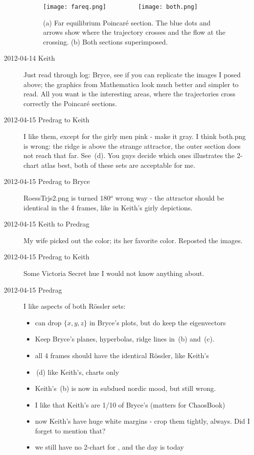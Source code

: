 \begin{description}
 \begin{figure}[H]
 \begin{center}
\texttt{[image: fareq.png]}%
~~~~~~~~
\texttt{[image: both.png]}%
 \end{center}
 \caption{
(a)
Far equilibrium Poincar\'e section. The blue dots and arrows show where
the trajectory crosses and the flow at the crossing.
(b)
Both sections superimposed.
    }{\label{fig:bothpoin}}
 \end{figure}

\item[2012-04-14 Keith] Just read through log: Bryce, see if you can
replicate the images I posed above; the graphics from Mathematica look
much better and simpler to read.  All you want is the interesting areas,
where the trajectories cross correctly the Poincar\'e sections.

\item[2012-04-15 Predrag to Keith] I like them, except for the girly men
pink - make it gray. I think both.png is wrong: the ridge is above the
strange attractor, the outer section does not reach that far. See
\,(d). You guys decide which ones illustrates the
2-chart atlas  best, both of these sets are acceptable for me.


\item[2012-04-15 Predrag to Bryce] RoessTrjs2.png is turned 180$^o$ wrong
way - the attractor should be identical in the 4 frames, like in Keith's
girly depictions.

\item[2012-04-15 Keith to Predrag] My wife picked out the color; its her
favorite color.  Reposted the images.

\item[2012-04-15 Predrag to Keith]
Some Victoria Secret hue I would not know anything about.

\item[2012-04-15 Predrag] I like aspects of both R\"ossler sets:

\begin{itemize}
  \item can drop $\{x,y,z\}$ in Bryce's plots, but do keep the eigenvectors
  \item Keep Bryce's planes, hyperbolas, ridge lines in
        \,(b) and \,(c).
  \item all 4 frames should have the identical R\"ossler, like Keith's
  \item {}\,(d) like Keith's, charts only
  \item Keith's \,(b) is now in subdued nordic mood, but still
        wrong.
  \item I like that Keith's are 1/10 of Bryce's (matters for ChaosBook)
  \item now Keith's have huge white margins - crop them tightly, always.
        Did I forget to mention that?
  \item we still have no 2-chart for \cLe, and the day is today
\end{itemize}


\end{description}
